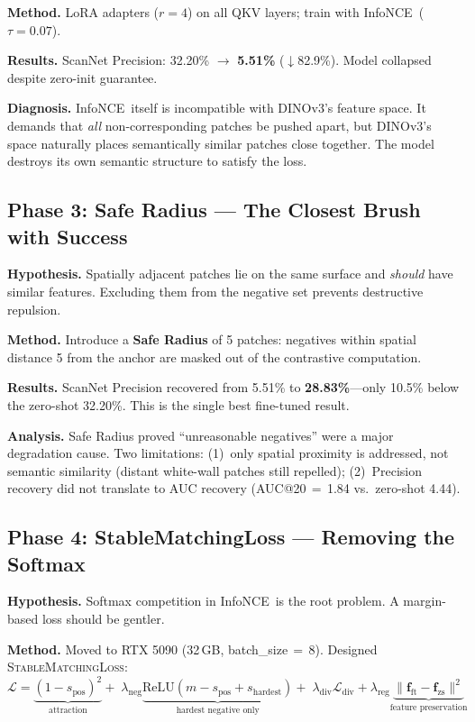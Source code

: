 \documentclass[11pt,a4paper]{article}
\newcommand{\infonce}{InfoNCE\ }
\newcommand{\methodname}[1]{\textsc{#1}}
\begin{document}
\textbf{Method.} LoRA adapters ($r=4$) on all QKV layers; train with \infonce ($\tau=0.07$).

\textbf{Results.} ScanNet Precision: 32.20\% $\rightarrow$ \textbf{5.51\%} ($\downarrow$82.9\%). Model collapsed despite zero-init guarantee.

\textbf{Diagnosis.} \infonce itself is incompatible with DINOv3's feature space. It demands that \emph{all} non-corresponding patches be pushed apart, but DINOv3's space naturally places semantically similar patches close together. The model destroys its own semantic structure to satisfy the loss.

\subsection{Phase 3: Safe Radius --- The Closest Brush with Success}

\textbf{Hypothesis.} Spatially adjacent patches lie on the same surface and \emph{should} have similar features. Excluding them from the negative set prevents destructive repulsion.

\textbf{Method.} Introduce a \textbf{Safe Radius} of 5 patches: negatives within spatial distance 5 from the anchor are masked out of the contrastive computation.

\textbf{Results.} ScanNet Precision recovered from 5.51\% to \textbf{28.83\%}---only 10.5\% below the zero-shot 32.20\%. This is the single best fine-tuned result.

\textbf{Analysis.} Safe Radius proved ``unreasonable negatives'' were a major degradation cause. Two limitations: (1)~only spatial proximity is addressed, not semantic similarity (distant white-wall patches still repelled); (2)~Precision recovery did not translate to AUC recovery (AUC@20\,$=$\,1.84 vs.\ zero-shot 4.44).

\subsection{Phase 4: StableMatchingLoss --- Removing the Softmax}

\textbf{Hypothesis.} Softmax competition in \infonce is the root problem. A margin-based loss should be gentler.

\textbf{Method.} Moved to RTX 5090 (32\,GB, batch\_size\,$=$\,8). Designed \methodname{StableMatchingLoss}:
\begin{equation}
\mathcal{L} = \underbrace{(1-s_{\text{pos}})^2}_{\text{attraction}} +\; \lambda_{\text{neg}}\underbrace{\text{ReLU}(m - s_{\text{pos}} + s_{\text{hardest}})}_{\text{hardest negative only}} +\; \lambda_{\text{div}}\mathcal{L}_{\text{div}} + \lambda_{\text{reg}}\underbrace{\|\mathbf{f}_{\text{ft}} - \mathbf{f}_{\text{zs}}\|^2}_{\text{feature preservation}}
\end{equation}
\end{document}
